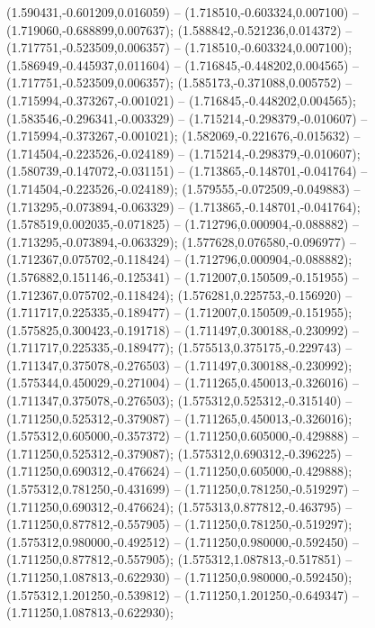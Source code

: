  (1.590431,-0.601209,0.016059) -- (1.718510,-0.603324,0.007100) -- (1.719060,-0.688899,0.007637);
 (1.588842,-0.521236,0.014372) -- (1.717751,-0.523509,0.006357) -- (1.718510,-0.603324,0.007100);
 (1.586949,-0.445937,0.011604) -- (1.716845,-0.448202,0.004565) -- (1.717751,-0.523509,0.006357);
 (1.585173,-0.371088,0.005752) -- (1.715994,-0.373267,-0.001021) -- (1.716845,-0.448202,0.004565);
 (1.583546,-0.296341,-0.003329) -- (1.715214,-0.298379,-0.010607) -- (1.715994,-0.373267,-0.001021);
 (1.582069,-0.221676,-0.015632) -- (1.714504,-0.223526,-0.024189) -- (1.715214,-0.298379,-0.010607);
 (1.580739,-0.147072,-0.031151) -- (1.713865,-0.148701,-0.041764) -- (1.714504,-0.223526,-0.024189);
 (1.579555,-0.072509,-0.049883) -- (1.713295,-0.073894,-0.063329) -- (1.713865,-0.148701,-0.041764);
 (1.578519,0.002035,-0.071825) -- (1.712796,0.000904,-0.088882) -- (1.713295,-0.073894,-0.063329);
 (1.577628,0.076580,-0.096977) -- (1.712367,0.075702,-0.118424) -- (1.712796,0.000904,-0.088882);
 (1.576882,0.151146,-0.125341) -- (1.712007,0.150509,-0.151955) -- (1.712367,0.075702,-0.118424);
 (1.576281,0.225753,-0.156920) -- (1.711717,0.225335,-0.189477) -- (1.712007,0.150509,-0.151955);
 (1.575825,0.300423,-0.191718) -- (1.711497,0.300188,-0.230992) -- (1.711717,0.225335,-0.189477);
 (1.575513,0.375175,-0.229743) -- (1.711347,0.375078,-0.276503) -- (1.711497,0.300188,-0.230992);
 (1.575344,0.450029,-0.271004) -- (1.711265,0.450013,-0.326016) -- (1.711347,0.375078,-0.276503);
 (1.575312,0.525312,-0.315140) -- (1.711250,0.525312,-0.379087) -- (1.711265,0.450013,-0.326016);
 (1.575312,0.605000,-0.357372) -- (1.711250,0.605000,-0.429888) -- (1.711250,0.525312,-0.379087);
 (1.575312,0.690312,-0.396225) -- (1.711250,0.690312,-0.476624) -- (1.711250,0.605000,-0.429888);
 (1.575312,0.781250,-0.431699) -- (1.711250,0.781250,-0.519297) -- (1.711250,0.690312,-0.476624);
 (1.575313,0.877812,-0.463795) -- (1.711250,0.877812,-0.557905) -- (1.711250,0.781250,-0.519297);
 (1.575312,0.980000,-0.492512) -- (1.711250,0.980000,-0.592450) -- (1.711250,0.877812,-0.557905);
 (1.575312,1.087813,-0.517851) -- (1.711250,1.087813,-0.622930) -- (1.711250,0.980000,-0.592450);
 (1.575312,1.201250,-0.539812) -- (1.711250,1.201250,-0.649347) -- (1.711250,1.087813,-0.622930);
